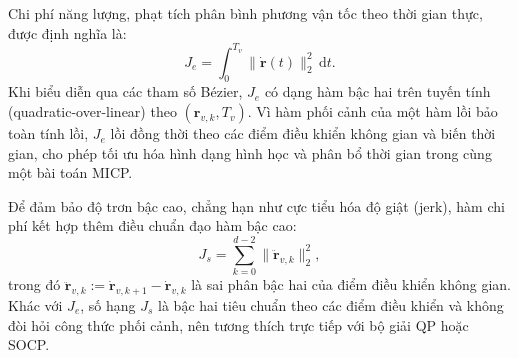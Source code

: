 Chi phí năng lượng, phạt tích phân bình phương vận tốc theo thời gian thực,
được định nghĩa là:
\begin{equation}
  J_e = \int_0^{T_v} \|\dot{\mathbf{r}}(t)\|_2^2\, \mathrm{d}t.
  \label{eq:energy_cost}
\end{equation}
Khi biểu diễn qua các tham số Bézier, $J_e$ có dạng hàm bậc hai trên tuyến tính
(quadratic-over-linear) theo $(\mathbf{r}_{v,k}, T_v)$.
Vì hàm phối cảnh của một hàm lồi bảo toàn tính lồi, $J_e$ lồi đồng thời theo các
điểm điều khiển không gian và biến thời gian, cho phép tối ưu hóa hình dạng hình học
và phân bổ thời gian trong cùng một bài toán MICP.

Để đảm bảo độ trơn bậc cao, chẳng hạn như cực tiểu hóa độ giật (jerk), hàm chi phí
kết hợp thêm điều chuẩn đạo hàm bậc cao:
\begin{equation}
  J_s = \sum_{k=0}^{d-2} \|\ddot{\mathbf{r}}_{v,k}\|_2^2,
  \label{eq:smooth_cost}
\end{equation}
trong đó $\ddot{\mathbf{r}}_{v,k} := \dot{\mathbf{r}}_{v,k+1} - \dot{\mathbf{r}}_{v,k}$
là sai phân bậc hai của điểm điều khiển không gian.
Khác với $J_e$, số hạng $J_s$ là bậc hai tiêu chuẩn theo các điểm điều khiển và
không đòi hỏi công thức phối cảnh, nên tương thích trực tiếp với bộ giải QP hoặc SOCP.
